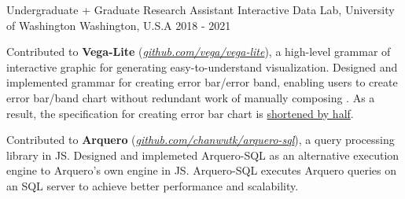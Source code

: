 \begin{cventries}
  \cvwork
    {Undergraduate + Graduate Research Assistant} %
    {Interactive Data Lab, University of Washington} %
    {Washington, U.S.A} %
    {2018 - 2021} %
    {
      \begin{cvitems} %
        \item {
          Contributed to \textbf{Vega-Lite} (\href{https://www.github.com/vega/vega-lite}{\textit{github.com/vega/vega-lite}}), a high-level grammar of interactive graphic for generating easy-to-understand visualization.
          Designed and implemented grammar for creating error bar/error band,
          enabling users to create error bar/band chart without  redundant work of manually composing .
          As a result, the specification for creating error bar chart is \underline{shortened by half}.
        }
        \item {
          Contributed to \textbf{Arquero} (\href{https://www.github.com/chanwutk/arquero-sql}{\textit{github.com/chanwutk/arquero-sql}}), a query processing library in JS.
          Designed and implemeted Arquero-SQL as an alternative execution engine to Arquero's own engine in JS.
          Arquero-SQL executes Arquero queries on an SQL server to achieve better performance and scalability.
        }
      \end{cvitems}
    }



\end{cventries}
